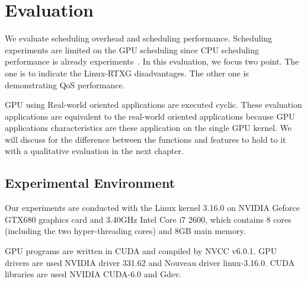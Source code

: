 \section{Evaluation}\label{sec:evaluation}
We evaluate scheduling overhead and scheduling performance.
Scheduling experiments are limited on the GPU scheduling since CPU scheduling performance is already experiments~\cite{kato2009loadable}.
In this evaluation, we focus two point.
The one is to indicate the Linux-RTXG disadvantages.
The other one is demonstrating QoS performance.


GPU using Real-world oriented applications\cite{hirabayashi:cpsna2013,tokamak} are executed cyclic.
These evaluation applications are equivalent to the real-world oriented applications
because GPU applications characteristics are these application on the single GPU kernel.
We will discuss for the difference between the functions and features to hold to it with a qualitative evaluation in the next chapter.



\subsection{Experimental Environment}
Our experiments are conducted with the Linux kernel 3.16.0 on NVIDIA Geforce GTX680 graphics card and 3.40GHz Intel Core i7 2600, which contains 8 cores (including the two hyper-threading cores) and 8GB main memory.

GPU programs are written in CUDA and compiled by NVCC v6.0.1.
GPU drivers are used NVIDIA driver 331.62 and Nouveau driver linux-3.16.0.
CUDA libraries are used NVIDIA CUDA-6.0 and Gdev.

